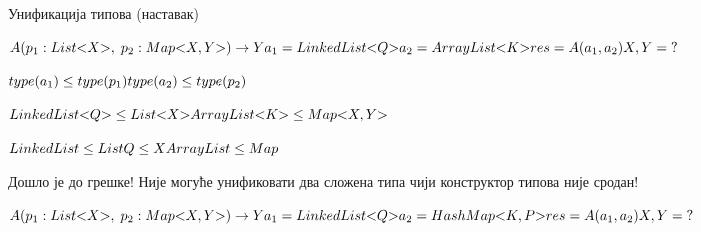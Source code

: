 \documentclass[xcolor=table]{beamer}
\begin{document}
\begin{frame}[allowframebreaks]{Унификација типова (наставак)}
        \framebreak
        
        \begin{math}
A(p_1: List\mathord{<}X\mathord{>},\;p_2: Map\mathord{<}X, Y\mathord{>})\to Y
\newline
a_1 = LinkedList\mathord{<}Q\mathord{>}
\newline
a_2 = ArrayList\mathord{<}K\mathord{>}
\newline
\newline
res = A(a_1, a_2)
\newline
X, Y = \;?
        \end{math}
        
        \framebreak
        
        \begin{math}
type(a_1) \leq type(p_1)
\newline
type(a_2) \leq type(p_2)
\newline
        \end{math}
        
        \framebreak
        
        \begin{math}
LinkedList\mathord{<}Q\mathord{>} \leq List\mathord{<}X\mathord{>}
\newline
ArrayList\mathord{<}K\mathord{>} \leq Map\mathord{<}X, Y\mathord{>}
        \end{math}
        
        \framebreak
        
        \begin{math}
LinkedList \leq List
\newline
Q \leq X
\newline
ArrayList \leq Map
\newline
        \end{math}
        
        Дошло је до грешке!
        \newline\newline
        Није могуће унификовати два сложена типа чији конструктор типова није сродан!
        
        \framebreak
        
        \begin{math}
A(p_1: List\mathord{<}X\mathord{>},\;p_2: Map\mathord{<}X, Y\mathord{>})\to Y
\newline
a_1 = LinkedList\mathord{<}Q\mathord{>}
\newline
a_2 = HashMap\mathord{<}K, P\mathord{>}
\newline
\newline
res = A(a_1, a_2)
\newline
X, Y = \;?
        \end{math}
        

\end{frame}
\end{document}

